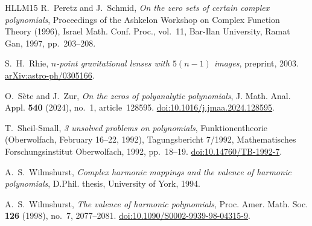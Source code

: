 \documentclass[a4paper]{amsart}
\theoremstyle{remark}
\begin{document}
\begin{thebibliography}{HLLM15}
R.~Peretz and J.~Schmid, \emph{On the zero sets of certain complex polynomials},
Proceedings of the Ashkelon Workshop on Complex Function Theory (1996),
Israel Math. Conf. Proc., vol.~11, Bar-Ilan University, Ramat Gan, 1997,
pp.~203--208.

S.~H.~Rhie, \emph{\(n\)-point gravitational lenses with \(5(n-1)\) images},
preprint, 2003.
\href{https://arxiv.org/abs/astro-ph/0305166}{arXiv:astro-ph/0305166}.

O.~S\`ete and J.~Zur, \emph{On the zeros of polyanalytic polynomials},
J. Math. Anal. Appl. \textbf{540} (2024), no.~1, article~128595.
\href{https://doi.org/10.1016/j.jmaa.2024.128595}{doi:10.1016/j.jmaa.2024.128595}.

T.~Sheil-Small, \emph{3 unsolved problems on polynomials},
Funktionentheorie (Oberwolfach, February 16--22, 1992),
Tagungsbericht 7/1992, Mathematisches Forschungsinstitut Oberwolfach,
1992, pp.~18--19.
\href{https://doi.org/10.14760/TB-1992-7}{doi:10.14760/TB-1992-7}.

A.~S.~Wilmshurst, \emph{Complex harmonic mappings and the valence
of harmonic polynomials}, D.Phil. thesis, University of York, 1994.

A.~S.~Wilmshurst, \emph{The valence of harmonic polynomials},
Proc. Amer. Math. Soc. \textbf{126} (1998), no.~7, 2077--2081.
\href{https://doi.org/10.1090/S0002-9939-98-04315-9}{doi:10.1090/S0002-9939-98-04315-9}.

\end{thebibliography}
\end{document}
